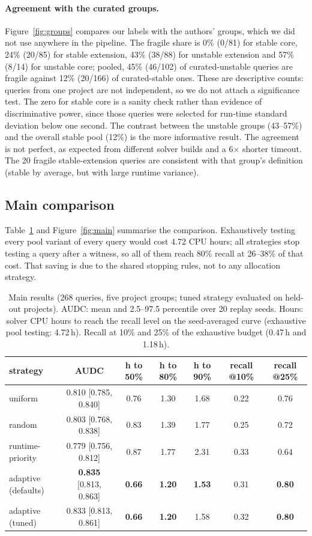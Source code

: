 \documentclass[11pt]{article}
\begin{document}
\paragraph{Agreement with the curated groups.} Figure~\ref{fig:groups} compares our labels with the authors' groups, which we did not use anywhere in the pipeline. The fragile share is 0\% (0/81) for stable core, 24\% (20/85) for stable extension, 43\% (38/88) for unstable extension and 57\% (8/14) for unstable core; pooled, 45\% (46/102) of curated-unstable queries are fragile against 12\% (20/166) of curated-stable ones. These are descriptive counts: queries from one project are not independent, so we do not attach a significance test. The zero for stable core is a sanity check rather than evidence of discriminative power, since those queries were selected for run-time standard deviation below one second. The contrast between the unstable groups (43--57\%) and the overall stable pool (12\%) is the more informative result. The agreement is not perfect, as expected from different solver builds and a 6$\times$ shorter timeout. The 20 fragile stable-extension queries are consistent with that group's definition (stable by average, but with large runtime variance).

\subsection{Main comparison}

Table~\ref{tab:main} and Figure~\ref{fig:main} summarise the comparison. Exhaustively testing every pool variant of every query would cost 4.72 CPU hours; all strategies stop testing a query after a witness, so all of them reach 80\% recall at 26--38\% of that cost. That saving is due to the shared stopping rules, not to any allocation strategy.

\begin{table}[t]
\centering
\caption{Main results (268 queries, five project groups; tuned strategy evaluated on held-out projects). AUDC: mean and 2.5--97.5 percentile over 20 replay seeds. Hours: solver CPU hours to reach the recall level on the seed-averaged curve (exhaustive pool testing: 4.72\,h). Recall at 10\% and 25\% of the exhaustive budget (0.47\,h and 1.18\,h).}
\label{tab:main}
\footnotesize
\setlength{\tabcolsep}{4pt}
\begin{tabular}{lcccccc}
\toprule
strategy & AUDC & h to 50\% & h to 80\% & h to 90\% & recall @10\% & recall @25\%\\
\midrule
uniform & 0.810 [0.785, 0.840] & 0.76 & 1.30 & 1.68 & 0.22 & 0.76\\
random & 0.803 [0.768, 0.838] & 0.83 & 1.39 & 1.77 & 0.25 & 0.72\\
runtime-priority & 0.779 [0.756, 0.812] & 0.87 & 1.77 & 2.31 & 0.33 & 0.64\\
adaptive (defaults) & \textbf{0.835} [0.813, 0.863] & \textbf{0.66} & \textbf{1.20} & \textbf{1.53} & 0.31 & \textbf{0.80}\\
adaptive (tuned) & 0.833 [0.813, 0.861] & \textbf{0.66} & \textbf{1.20} & 1.58 & 0.32 & \textbf{0.80}\\
\bottomrule
\end{tabular}
\end{table}
\end{document}
